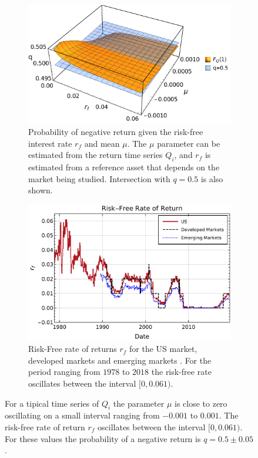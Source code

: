 \documentclass[a4paper]{jpconf}
\begin{document}
\begin{figure}[h!tb]
	\centering
        \begin{subfigure}[b]{0.45\textwidth}
            \centering
            \includegraphics[width=\textwidth]{img/model_q}
            \caption[]{\small Probability of negative return given the risk-free interest rate $r_f$ and mean $\mu$. The $\mu$ parameter can be estimated from the return time series $Q_i$, and $r_f$ is estimated from a reference asset that depends on the market being studied. Intersection with $q=0.5$ is also shown.}    
            \label{fig:model_q}
        \end{subfigure}
        \quad
        \begin{subfigure}[b]{0.45\textwidth}  
            \centering 
            \includegraphics[width=\textwidth]{img/riskfree_rate}
            \caption[]{\small Risk-Free rate of returns $r_f$ for the US market, developed markets and emerging markets \cite{French}. For the period ranging from $1978$ to $2018$ the risk-free rate oscillates between the interval $[0, 0.061)$.}
            \label{fig:rf}
      
        \end{subfigure}
        \caption{\small For a tipical time series of $Q_i$ the parameter $\mu$ is close to zero oscillating on a small interval ranging from $-0.001$ to $0.001$. The risk-free rate of return $r_f$ oscillates between the interval $[0, 0.061)$. For these values the probability of a negative return is $q = 0.5 \pm 0.05$.} 
	\label{fig:qvalue}
\end{figure}
\end{document}
